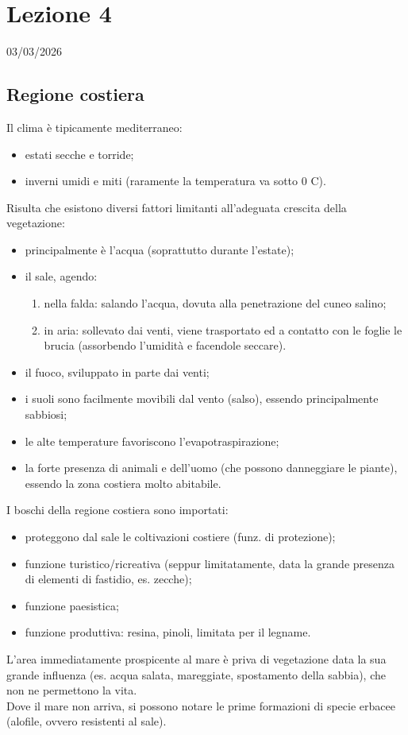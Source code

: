 \section{Lezione 4} \hfill 03/03/2026
\subsection{Regione costiera}
Il clima è tipicamente mediterraneo:
\begin{itemize}[nosep]
    \item estati secche e torride;
    \item inverni umidi e miti (raramente la temperatura va sotto 0 \textdegree C).
\end{itemize}
Risulta che esistono diversi fattori limitanti all'adeguata crescita della vegetazione:
\begin{itemize}[nosep]
    \item principalmente è l'acqua (soprattutto durante l'estate);
    \item il sale, agendo: 
    \begin{enumerate}[nosep]
        \item nella falda: salando l'acqua, dovuta alla penetrazione del cuneo salino;
        \item in aria: sollevato dai venti, viene trasportato ed a contatto con le foglie le brucia (assorbendo l'umidità e facendole seccare).
    \end{enumerate}
    \item il fuoco, sviluppato in parte dai venti;
    \item i suoli sono facilmente movibili dal vento (salso), essendo principalmente sabbiosi;
    \item le alte temperature favoriscono l'evapotraspirazione;
    \item la forte presenza di animali e dell'uomo (che possono danneggiare le piante), essendo la zona costiera molto abitabile. 
\end{itemize}
I boschi della regione costiera sono importati:
\begin{itemize}[nosep]
    \item proteggono dal sale le coltivazioni costiere (funz. di protezione);
    \item funzione turistico/ricreativa (seppur limitatamente, data la grande presenza di elementi di fastidio, es. zecche);
    \item funzione paesistica;
    \item funzione produttiva: resina, pinoli, limitata per il legname.
\end{itemize}
L'area immediatamente prospicente al mare è priva di vegetazione data la sua grande influenza (es. acqua salata, mareggiate, spostamento della sabbia), che non ne permettono la vita.\\
Dove il mare non arriva, si possono notare le prime formazioni di specie erbacee (alofile, ovvero resistenti al sale).
